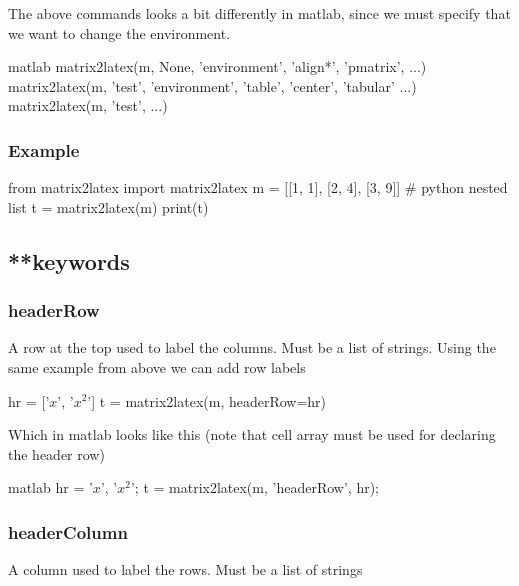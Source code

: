 The above commands looks a bit differently in matlab, since we must specify
that we want to change the environment.
\begin{pygments}{matlab}
matrix2latex(m, None, 'environment', {'align*', 'pmatrix'}, ...)
matrix2latex(m, 'test', 'environment', {'table', 'center', 'tabular'} ...)
matrix2latex(m, 'test', ...)
\end{pygments}

\subsubsection{Example}
\begin{pyblock}
from matrix2latex import matrix2latex
m = [[1, 1], [2, 4], [3, 9]] # python nested list
t = matrix2latex(m)
print(t)
\end{pyblock}

\subsection{**keywords}
\subsubsection{headerRow}
A row at the top used to label the columns.
Must be a list of strings.
Using the same example from above we can add row labels
\begin{pyblock}
hr = ['$x$', '$x^2$']
t = matrix2latex(m, headerRow=hr)
\end{pyblock}

Which in matlab looks like this (note that cell array must be used for
declaring the header row)
\begin{pygments}{matlab}
hr = {'$x$', '$x^2$'};
t = matrix2latex(m, 'headerRow', hr);
\end{pygments}

\subsubsection{headerColumn}
    A column used to label the rows.
    Must be a list of strings

